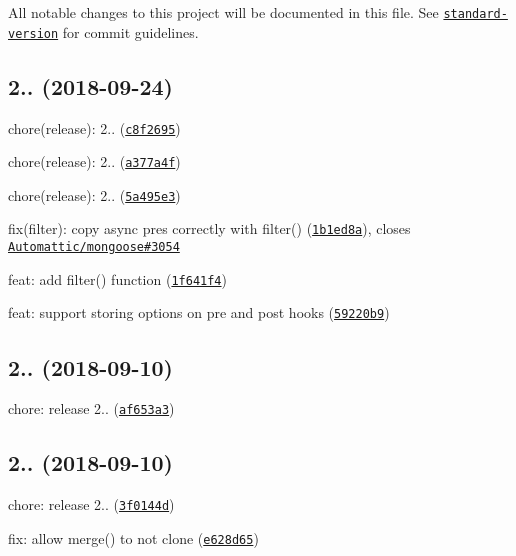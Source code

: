 All notable changes to this project will be documented in this file. See \href{https://github.com/conventional-changelog/standard-version}{\tt standard-\/version} for commit guidelines.

\label{_2.3.0}%
 \subsection*{2.. (2018-\/09-\/24)}


\begin{DoxyItemize}
\item chore(release)\+: 2.. (\href{https://github.com/vkarpov15/kareem/commit/c8f2695}{\tt c8f2695})
\item chore(release)\+: 2.. (\href{https://github.com/vkarpov15/kareem/commit/a377a4f}{\tt a377a4f})
\item chore(release)\+: 2.. (\href{https://github.com/vkarpov15/kareem/commit/5a495e3}{\tt 5a495e3})
\item fix(filter)\+: copy async pres correctly with {\ttfamily filter()} (\href{https://github.com/vkarpov15/kareem/commit/1b1ed8a}{\tt 1b1ed8a}), closes \href{https://github.com/Automattic/mongoose/issues/3054}{\tt Automattic/mongoose\#3054}
\item feat\+: add filter() function (\href{https://github.com/vkarpov15/kareem/commit/1f641f4}{\tt 1f641f4})
\item feat\+: support storing options on pre and post hooks (\href{https://github.com/vkarpov15/kareem/commit/59220b9}{\tt 59220b9})
\end{DoxyItemize}

\label{_2.2.3}%
 \subsection*{
\footnotesize 2.. (2018-\/09-\/10)
\normalsize }


\begin{DoxyItemize}
\item chore\+: release 2.. (\href{https://github.com/vkarpov15/kareem/commit/af653a3}{\tt af653a3})
\end{DoxyItemize}

\label{_2.2.2}%
 \subsection*{
\footnotesize 2.. (2018-\/09-\/10)
\normalsize }


\begin{DoxyItemize}
\item chore\+: release 2.. (\href{https://github.com/vkarpov15/kareem/commit/3f0144d}{\tt 3f0144d})
\item fix\+: allow merge() to not clone (\href{https://github.com/vkarpov15/kareem/commit/e628d65}{\tt e628d65})
\end{DoxyItemize}

